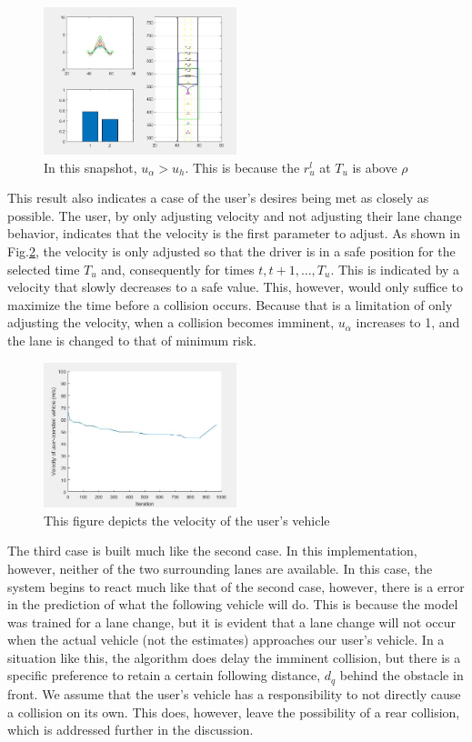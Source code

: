 \documentclass[conference]{IEEEtran}
\begin{document}
\begin{figure}[ht]
    \includegraphics[width=0.5\textwidth]{cs2.JPG}
    \caption{In this snapshot, $u_{\alpha} > u_{h}$. This is because the $r^l_u$ at $T_u$ is above $\rho$}
    \label{fig:cs2}
\end{figure}

This result also indicates a case of the user's desires being met as closely as possible. The user, by only adjusting velocity and not adjusting their lane change behavior, indicates that the velocity is the first parameter to adjust. As shown in Fig.\ref{fig:cs2c}, the velocity is only adjusted so that the driver is in a safe position for the selected time $T_u$ and, consequently for times $t,t+1,\ldots,T_u$. This is indicated by a velocity that slowly decreases to a safe value. This, however, would only suffice to maximize the time before a collision occurs. Because that is a limitation of only adjusting the velocity, when a collision becomes imminent, $u_\alpha$ increases to 1, and the lane is changed to that of minimum risk.

\begin{figure}[ht]
    \includegraphics[width=0.5\textwidth]{cs2c.JPG}
    \caption{This figure depicts the velocity of the user's vehicle}
    \label{fig:cs2c}
\end{figure}

The third case is built much like the second case. In this implementation, however, neither of the two surrounding lanes are available. In this case, the system begins to react much like that of the second case, however, there is a error in the prediction of what the following vehicle will do. This is because the model was trained for a lane change, but it is evident that a lane change will not occur when the actual vehicle (not the estimates) approaches our user's vehicle. In a situation like this, the algorithm does delay the imminent collision, but there is a specific preference to retain a certain following distance, $d_q$ behind the obstacle in front. We assume that the user's vehicle has a responsibility to not directly cause a collision on its own. This does, however, leave the possibility of a rear collision, which is addressed further in the discussion.
\end{document}
